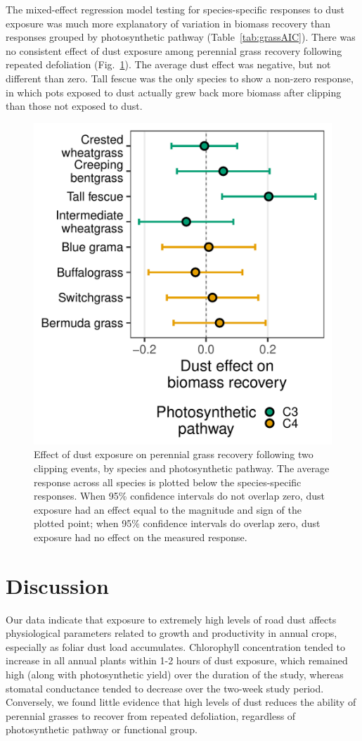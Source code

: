 \documentclass{svjour3}
\begin{document}
The mixed-effect regression model testing for species-specific responses to dust exposure was much more explanatory of variation in biomass recovery than responses grouped by photosynthetic pathway (Table~\ref{tab:grassAIC}).
There was no consistent effect of dust exposure among perennial grass recovery following repeated defoliation (Fig.~\ref{fig:grassCIs}). 
The average dust effect was negative, but not different than zero. 
Tall fescue was the only species to show a non-zero response, in which pots exposed to dust actually grew back more biomass after clipping than those not exposed to dust. 

 

\begin{figure}
	\centering
	\includegraphics[width=0.6\linewidth]{figures/GrassCIs-1}
	\caption{Effect of dust exposure on perennial grass recovery following two clipping events, by species and photosynthetic pathway. 
		The average response across all species is plotted below the species-specific responses.
		When 95\% confidence intervals do not overlap zero, dust exposure had an effect equal to the magnitude and sign of the plotted point; when 95\% confidence intervals do overlap zero, dust exposure had no effect on the measured response. \label{fig:grassCIs} }
\end{figure}


\clearpage 

\section{Discussion} 

Our data indicate that exposure to extremely high levels of road dust affects physiological parameters related to growth and productivity in annual crops, especially as foliar dust load accumulates. 
Chlorophyll concentration tended to increase in all annual plants within 1-2 hours of dust exposure, which remained high (along with photosynthetic yield) over the duration of the study, whereas stomatal conductance tended to decrease over the two-week study period.
Conversely, we found little evidence that high levels of dust reduces the ability of perennial grasses to recover from repeated defoliation, regardless of photosynthetic pathway or functional group. 
\end{document}
